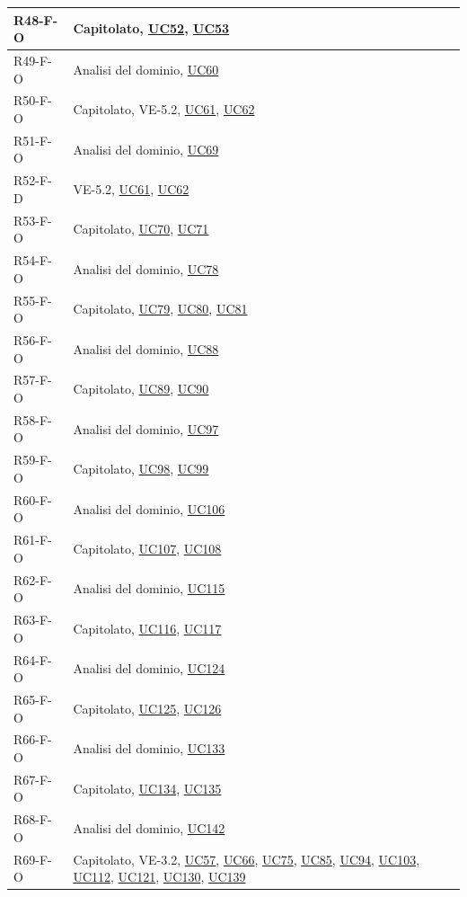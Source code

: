 \begin{longtable}{|p{2.8cm}|p{10.2cm}|}
	R48-F-O & Capitolato, \hyperlink{uc52}{UC52}, \hyperlink{uc53}{UC53} \\ \hline
	R49-F-O & Analisi del dominio, \hyperlink{uc60}{UC60} \\ \hline
	R50-F-O & Capitolato, VE-5.2, \hyperlink{uc61}{UC61}, \hyperlink{uc62}{UC62} \\ \hline
	R51-F-O & Analisi del dominio, \hyperlink{uc69}{UC69} \\ \hline
	R52-F-D & VE-5.2, \hyperlink{uc61}{UC61}, \hyperlink{uc62}{UC62} \\ \hline
	R53-F-O & Capitolato, \hyperlink{uc70}{UC70}, \hyperlink{uc71}{UC71} \\ \hline
	R54-F-O & Analisi del dominio, \hyperlink{uc78}{UC78} \\ \hline
	R55-F-O & Capitolato, \hyperlink{uc79}{UC79}, \hyperlink{uc80}{UC80}, \hyperlink{uc81}{UC81} \\ \hline
	R56-F-O & Analisi del dominio, \hyperlink{uc88}{UC88} \\ \hline
	R57-F-O & Capitolato, \hyperlink{uc89}{UC89}, \hyperlink{uc90}{UC90} \\ \hline
	R58-F-O & Analisi del dominio, \hyperlink{uc97}{UC97} \\ \hline
	R59-F-O & Capitolato, \hyperlink{uc98}{UC98}, \hyperlink{uc99}{UC99} \\ \hline
	R60-F-O & Analisi del dominio, \hyperlink{uc106}{UC106} \\ \hline
	R61-F-O & Capitolato, \hyperlink{uc107}{UC107}, \hyperlink{uc108}{UC108} \\ \hline
	R62-F-O & Analisi del dominio, \hyperlink{uc115}{UC115} \\ \hline
	R63-F-O & Capitolato, \hyperlink{uc116}{UC116}, \hyperlink{uc117}{UC117} \\ \hline
	R64-F-O & Analisi del dominio, \hyperlink{uc124}{UC124} \\ \hline
	R65-F-O & Capitolato, \hyperlink{uc125}{UC125}, \hyperlink{uc126}{UC126} \\ \hline
	R66-F-O & Analisi del dominio, \hyperlink{uc133}{UC133} \\ \hline
	R67-F-O & Capitolato, \hyperlink{uc134}{UC134}, \hyperlink{uc135}{UC135} \\ \hline
	R68-F-O & Analisi del dominio, \hyperlink{uc142}{UC142} \\ \hline
	R69-F-O & Capitolato, VE-3.2, \hyperlink{uc57}{UC57}, \hyperlink{uc66}{UC66}, \hyperlink{uc75}{UC75}, \hyperlink{uc85}{UC85}, \hyperlink{uc94}{UC94}, \hyperlink{uc103}{UC103}, \hyperlink{uc112}{UC112}, \hyperlink{uc121}{UC121}, \hyperlink{uc130}{UC130}, \hyperlink{uc139}{UC139} \\ \hline

\end{longtable}
